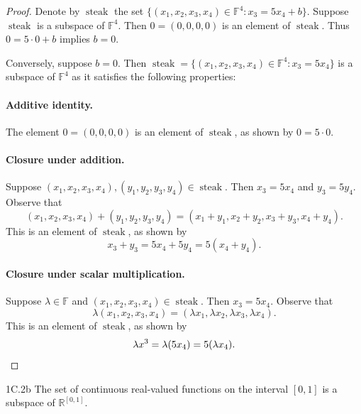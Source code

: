 \documentclass{exam}
\begin{document}
\begin{proof}
    Denote by $\operatorname{steak}$ the set $\{(x_1, x_2, x_3, x_4) \in \mathbb F^4: x_3 = 5x_4 + b\}$. Suppose $\operatorname{steak}$ is a subspace of $\mathbb F^4$. Then $0 = (0, 0, 0, 0)$ is an element of $\operatorname{steak}$. Thus $0 = 5\cdot0 + b$ implies $b = 0$.

    Conversely, suppose $b = 0$. Then $\operatorname{steak} = \{(x_1, x_2, x_3, x_4) \in \mathbb F^4: x_3 = 5x_4\}$ is a subspace of $\mathbb F^4$ as it satisfies the following properties:
    \paragraph{Additive identity.} The element $0 = (0, 0, 0, 0)$ is an element of $\operatorname{steak}$, as shown by $0 = 5\cdot0$.

    \paragraph{Closure under addition.} Suppose $(x_1, x_2, x_3, x_4),(y_1, y_2, y_3, y_4)\in\operatorname{steak}$. Then $x_3 = 5x_4$ and $y_3 = 5y_4$. Observe that \[
        (x_1, x_2, x_3, x_4) + (y_1, y_2, y_3, y_4) = (x_1 + y_1, x_2 + y_2, x_3 + y_3, x_4 + y_4).
    \]
    This is an element of $\operatorname{steak}$, as shown by \[
        x_3 + y_3 = 5x_4 + 5y_4 = 5(x_4 + y_4).
    \]

    \paragraph{Closure under scalar multiplication.} Suppose $\lambda\in\mathbb F$ and $(x_1, x_2, x_3, x_4)\in\operatorname{steak}$. Then $x_3 = 5x_4$. Observe that \[
        \lambda(x_1, x_2, x_3, x_4) = (\lambda x_1, \lambda x_2, \lambda x_3, \lambda x_4).
    \]
    This is an element of $\operatorname{steak}$, as shown by \[
        \lambda x^3 = \lambda(5x_4) = 5(\lambda x_4). \qedhere
    \]
\end{proof}

\begin{problem}{1C.2b}
    The set of continuous real-valued functions on the interval $[0, 1]$ is a subspace of $\mathbb R^{[0, 1]}$.
\end{problem}
\end{document}
